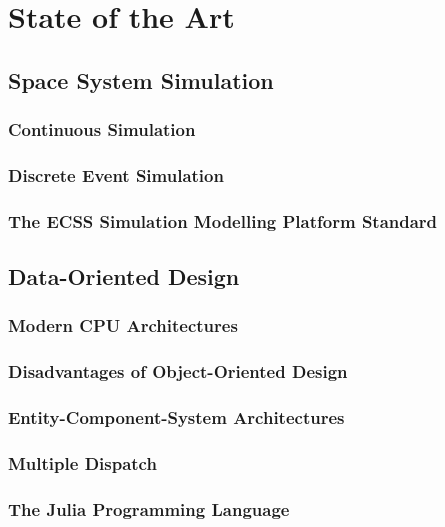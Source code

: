 \chapter{State of the Art}
\label{sec:state-of-the-art}

\section{Space System Simulation}
\label{sec:space-system-simulation}

\subsection{Continuous Simulation}
\label{sec:continuous-simulation}

\subsection{Discrete Event Simulation}
\label{sec:discrete-event-simulation}

\subsection{The ECSS Simulation Modelling Platform Standard}
\label{sec:ecss-smp}

\section{Data-Oriented Design}
\label{sec:data-oriented-design}

\subsection{Modern CPU Architectures}
\label{sec:modern-cpu-architectures}

\subsection{Disadvantages of Object-Oriented Design}
\label{sec:disadvantages-oop}

\subsection{Entity-Component-System Architectures}
\label{sec:ecs-architectures}

\subsection{Multiple Dispatch}
\label{sec:multiple-dispatch}

\subsection{The Julia Programming Language}
\label{sec:julia}

